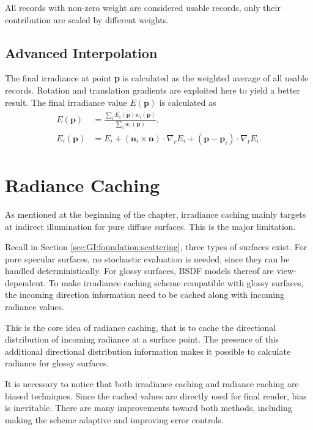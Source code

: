 \documentclass[]{book}
\begin{document}
All records with non-zero weight are considered usable records, only their contribution are scaled by different weights.

\subsection{Advanced Interpolation}
\label{sec:IC:usingdata:interpolate}
The final irradiance at point \textbf{p} is calculated as the weighted average of all usable records.
Rotation and translation gradients are exploited here to yield a better result.
The final irradiance value $E(\mathbf{p})$ is calculated as
\begin{gather}
\label{eq:IC:interpolation}
\begin{aligned}
	E(\mathbf{p}) &= \frac{\sum_i E_i(\mathbf{p})w_i(\mathbf{p})}{\sum_i w_i(\mathbf{p})}, \\
	E_i(\mathbf{p}) &= E_i + (\mathbf{n}_i \times \mathbf{n}) \cdot \nabla_r E_i + (\mathbf{p} - \mathbf{p}_i) \cdot \nabla_t E_i .
\end{aligned}
\end{gather}

\section{Radiance Caching}
\label{sec:IC:radiance}
As mentioned at the beginning of the chapter, irradiance caching mainly targets at indirect illumination for pure diffuse surfaces.
This is the major limitation.

Recall in Section \ref{sec:GI:foundation:scattering}, three types of surfaces exist.
For pure specular surfaces, no stochastic evaluation is needed, since they can be handled deterministically.
For glossy surfaces, BSDF models thereof are view-dependent.
To make irradiance caching scheme compatible with glossy surfaces, the incoming direction information need to be cached along with incoming radiance values.

This is the core idea of radiance caching, that is to cache the directional distribution of incoming radiance at a surface point.
The presence of this additional directional distribution information makes it possible to calculate radiance for glossy surfaces.

It is necessary to notice that both irradiance caching and radiance caching are biased techniques.
Since the cached values are directly used for final render, bias is inevitable.
There are many improvements toward both methods, including making the scheme adaptive and improving error controls.
\end{document}
